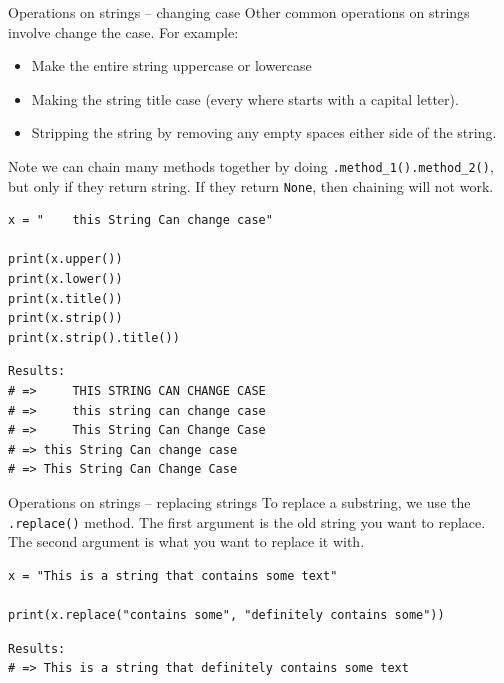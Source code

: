 \documentclass[10pt]{beamer}
\begin{document}
\begin{frame}[label={sec:orgbf6af11},fragile]{Operations on strings -- changing case}
 Other common operations on strings involve change the case. For example:

\begin{itemize}
\item Make the entire string uppercase or lowercase
\item Making the string title case (every where starts with a capital letter).
\item Stripping the string by removing any empty spaces either side of the string.
\end{itemize}

\alert{Note} we can chain many methods together by doing \texttt{.method\_1().method\_2()}, but only if they
return string. If they return \texttt{None}, then chaining will not work.

\begin{verbatim}
x = "    this String Can change case"

print(x.upper())
print(x.lower())
print(x.title())
print(x.strip())
print(x.strip().title())
\end{verbatim}

\begin{verbatim}
Results: 
# =>     THIS STRING CAN CHANGE CASE
# =>     this string can change case
# =>     This String Can Change Case
# => this String Can change case
# => This String Can Change Case
\end{verbatim}
\end{frame}

\begin{frame}[label={sec:org212bcea},fragile]{Operations on strings -- replacing strings}
 To replace a substring, we use the \texttt{.replace()} method. The first argument is the old
string you want to replace. The second argument is what you want to replace it with.

\begin{verbatim}
x = "This is a string that contains some text"

print(x.replace("contains some", "definitely contains some"))
\end{verbatim}

\begin{verbatim}
Results: 
# => This is a string that definitely contains some text
\end{verbatim}
\end{frame}
\end{document}
